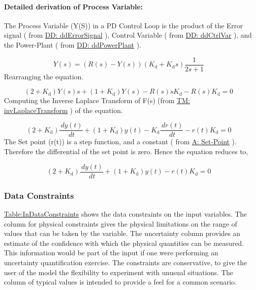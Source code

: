 \documentclass[12pt]{article}
\begin{document}
\paragraph{Detailed derivation of Process Variable:}
\label{IM:pdEquationIMDeriv}
The Process Variable (Y(S)) in a PD Control Loop is the product of the Error signal ( from  \hyperref[DD:ddErrorSignal]{DD: ddErrorSignal} ), Control Variable ( from \hyperref[DD:ddCtrlVar]{DD: ddCtrlVar}  ), and the Power-Plant ( from \hyperref[DD:ddPowerPlant]{DD: ddPowerPlant} ).

\begin{displaymath}
Y(s)=\left(R(s)-Y(s)\right) \left({K_{\text{d}}}+{K_{\text{d}}} s\right) \frac{1}{2 s+1}
\end{displaymath}
Rearranging the equation.

\begin{displaymath}
\left(2+{K_{\text{d}}}\right) Y(s) s+\left(1+{K_{\text{d}}}\right) Y(s)-R(s) s {K_{\text{d}}}-R(s) {K_{\text{d}}}=0
\end{displaymath}
Computing the Inverse Laplace Transform of F(s) (from  \hyperref[TM:invLaplaceTransform]{TM: invLaplaceTransform} ) of the equation.

\begin{displaymath}
\left(2+{K_{\text{d}}}\right) \frac{\,dy(t)}{\,dt}+\left(1+{K_{\text{d}}}\right) y(t)-{K_{\text{d}}} \frac{\,dr(t)}{\,dt}-r(t) {K_{\text{d}}}=0
\end{displaymath}
The Set point (r(t)) is a step function, and a constant  ( from  \hyperref[setPoint]{A: Set-Point} ). Therefore the  differential of the set point is zero. Hence the equation  reduces to,

\begin{displaymath}
\left(2+{K_{\text{d}}}\right) \frac{\,dy(t)}{\,dt}+\left(1+{K_{\text{d}}}\right) y(t)-r(t) {K_{\text{d}}}=0
\end{displaymath}
\subsubsection{Data Constraints}
\label{Sec:DataConstraints}
\hyperref[Table:InDataConstraints]{Table:InDataConstraints} shows the data constraints on the input variables. The column for physical constraints gives the physical limitations on the range of values that can be taken by the variable. The uncertainty column provides an estimate of the confidence with which the physical quantities can be measured. This information would be part of the input if one were performing an uncertainty quantification exercise. The constraints are conservative, to give the user of the model the flexibility to experiment with unusual situations. The column of typical values is intended to provide a feel for a common scenario.
\end{document}
